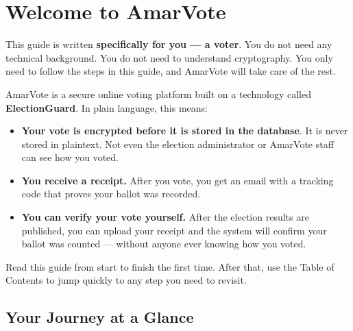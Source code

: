 \documentclass[12pt,a4paper,openany]{book}
\begin{document}
\frontmatter
\tableofcontents

\chapter*{Welcome to AmarVote}

This guide is written \textbf{specifically for you --- a voter}. You do not need any technical background. You do not need to understand cryptography. You only need to follow the steps in this guide, and AmarVote will take care of the rest.

AmarVote is a secure online voting platform built on a technology called \textbf{ElectionGuard}. In plain language, this means:

\begin{itemize}
	\item \textbf{Your vote is encrypted before it is stored in the database}. It is never stored in plaintext. Not even the election administrator or AmarVote staff can see how you voted.
	\item \textbf{You receive a receipt.} After you vote, you get an email with a tracking code that proves your ballot was recorded.
	\item \textbf{You can verify your vote yourself.} After the election results are published, you can upload your receipt and the system will confirm your ballot was counted --- without anyone ever knowing how you voted.
\end{itemize}

\begin{tcolorbox}[tipbox]
	Read this guide from start to finish the first time. After that, use the Table of Contents to jump quickly to any step you need to revisit.
\end{tcolorbox}

\section*{Your Journey at a Glance}
\end{document}
